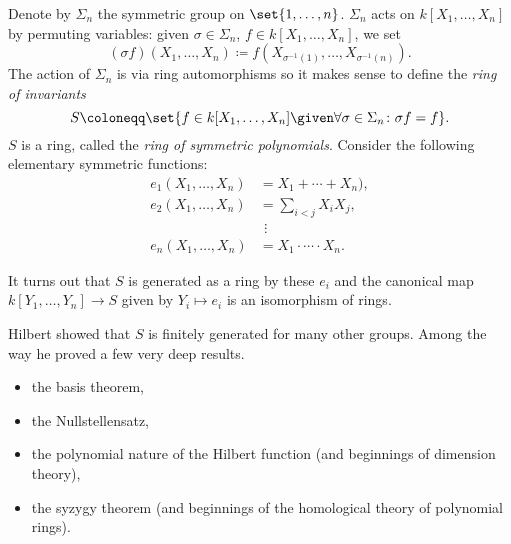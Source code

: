 Denote by $\Sigma_n$ the symmetric group on $\set{1, \ldots, n}$. $\Sigma_n$ acts
on $k[X_1, \ldots, X_n]$ by permuting variables: given $\sigma \in \Sigma_n$,
$f \in k[X_1, \ldots, X_n]$, we set
\[ (\sigma f)(X_1, \ldots, X_n)\coloneqq f(X_{\sigma^{-1}(1)}, \ldots, X_{\sigma^{-1}(n)}). \]
The action of $\Sigma_n$ is via ring automorphisms so it makes sense to define
the \emph{ring of invariants}
\[ S\coloneqq \set{f \in k[X_1, \ldots, X_n]\given \forall \sigma \in \Sigma_n\colon \sigma f = f}. \]
$S$ is a ring, called the \emph{ring of symmetric polynomials}. Consider the following
elementary symmetric functions:
\begin{align*}
	e_1(X_1, \ldots, X_n) &= X_1 + \cdots + X_n),\\
	e_2(X_1, \ldots, X_n) &= \sum_{i < j} X_iX_j,\\
	&\ \,\vdots\\
	e_n(X_1, \ldots, X_n)&= X_1\cdot\cdots\cdot X_n.
\end{align*}

It turns out that $S$ is generated as a ring by these $e_i$ and the canonical
map $k[Y_1, \ldots, Y_n]\to S$ given by $Y_i\mapsto e_i$ is an isomorphism of rings.

Hilbert showed that $S$ is finitely generated for many other groups. Among the
way he proved a few very deep results.
\begin{itemize}
	\item the basis theorem,
	\item the Nullstellensatz,
	\item the polynomial nature of the Hilbert function (and beginnings of dimension theory),
	\item the syzygy theorem (and beginnings of the homological theory of polynomial rings).
\end{itemize}
